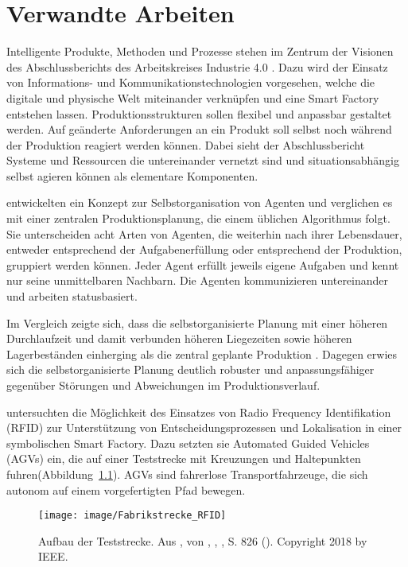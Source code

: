 \chapter{Verwandte Arbeiten}

Intelligente Produkte, Methoden und Prozesse stehen im Zentrum der Visionen des Abschlussberichts des Arbeitskreises Industrie 4.0 \parencite{arbeitsbericht}. Dazu wird der Einsatz von Informations- und Kommunikationstechnologien vorgesehen, welche die digitale und physische Welt miteinander verknüpfen und eine Smart Factory entstehen lassen.  Produktionsstrukturen sollen flexibel und anpassbar gestaltet werden. Auf geänderte Anforderungen an ein Produkt soll selbst noch während der Produktion reagiert werden können. Dabei sieht der Abschlussbericht Systeme und Ressourcen die untereinander vernetzt sind und situationsabhängig selbst agieren können als elementare Komponenten.

\textcite{agents} entwickelten ein Konzept zur Selbstorganisation von Agenten und verglichen es mit einer zentralen Produktionsplanung, die einem üblichen Algorithmus folgt. Sie unterscheiden acht Arten von Agenten, die weiterhin nach ihrer Lebensdauer, entweder entsprechend der Aufgabenerfüllung oder entsprechend der Produktion, gruppiert werden können. Jeder Agent erfüllt jeweils eigene Aufgaben und kennt nur seine unmittelbaren Nachbarn. Die Agenten kommunizieren untereinander und arbeiten statusbasiert.

Im Vergleich zeigte sich, dass die selbstorganisierte Planung mit einer höheren Durchlaufzeit und damit verbunden höheren Liegezeiten sowie höheren Lagerbeständen einherging als die zentral geplante Produktion \parencite{agents}. Dagegen erwies sich die selbstorganisierte Planung deutlich robuster und anpassungsfähiger gegenüber Störungen und Abweichungen im Produktionsverlauf.

\textcite{rfid} untersuchten die Möglichkeit des Einsatzes von Radio Frequency Identifikation (RFID) zur Unterstützung von Entscheidungsprozessen und Lokalisation in einer symbolischen Smart Factory. Dazu setzten sie Automated Guided Vehicles (AGVs) ein, die auf einer Teststrecke mit Kreuzungen und Haltepunkten fuhren(Abbildung~\ref{fig:fabrik}). AGVs sind fahrerlose Transportfahrzeuge, die sich autonom auf einem vorgefertigten Pfad bewegen.
\begin{figure}[ht]
    \centering
    \texttt{[image: image/Fabrikstrecke\_RFID]}
    \caption{Aufbau der Teststrecke. Aus , von \citeauthor{rfid}, \citeyear{rfid}, \textit{}, S. 826 (). Copyright 2018 by IEEE.}
    \label{fig:fabrik}
\end{figure}

